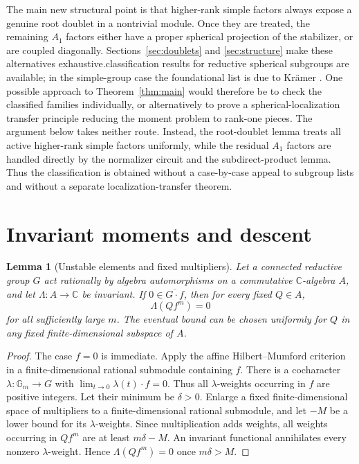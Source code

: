 \documentclass[11pt]{article}
\numberwithin{equation}{section}
\newtheorem{lemma}[theorem]{Lemma}
\theoremstyle{definition}
\theoremstyle{remark}
\newcommand{\C}{\mathbb C}
\newcommand{\Gm}{\mathbb G_m}
\begin{document}
The main new structural point is that higher-rank simple factors always expose a genuine root doublet in a nontrivial module. Once they are treated, the remaining $A_1$ factors either have a proper spherical projection of the stabilizer, or are coupled diagonally. Sections~\ref{sec:doublets} and \ref{sec:structure} make these alternatives exhaustive.\n\nClassical classification results for reductive spherical subgroups are available; in the simple-group case the foundational list is due to Kr\"amer \cite{Kramer}. One possible approach to Theorem~\ref{thm:main} would therefore be to check the classified families individually, or alternatively to prove a spherical-localization transfer principle reducing the moment problem to rank-one pieces. The argument below takes neither route. Instead, the root-doublet lemma treats all active higher-rank simple factors uniformly, while the residual $A_1$ factors are handled directly by the normalizer circuit and the subdirect-product lemma. Thus the classification is obtained without a case-by-case appeal to subgroup lists and without a separate localization-transfer theorem.

\section{Invariant moments and descent}
\begin{lemma}[Unstable elements and fixed multipliers]\label{lem:unstable}
Let a connected reductive group $G$ act rationally by algebra automorphisms on a commutative $\C$-algebra $A$, and let $\Lambda:A\to\C$ be invariant. If $0\in\overline{G\cdot f}$, then for every fixed $Q\in A$,
\[
 \Lambda(Qf^m)=0
\]
for all sufficiently large $m$. The eventual bound can be chosen uniformly for $Q$ in any fixed finite-dimensional subspace of $A$.
\end{lemma}
\begin{proof}
The case $f=0$ is immediate. Apply the affine Hilbert--Mumford criterion \cite{Kempf} in a finite-dimensional rational submodule containing $f$. There is a cocharacter $\lambda:\Gm\to G$ with $\lim_{t\to0}\lambda(t)\cdot f=0$. Thus all $\lambda$-weights occurring in $f$ are positive integers. Let their minimum be $\delta>0$. Enlarge a fixed finite-dimensional space of multipliers to a finite-dimensional rational submodule, and let $-M$ be a lower bound for its $\lambda$-weights. Since multiplication adds weights, all weights occurring in $Qf^m$ are at least $m\delta-M$. An invariant functional annihilates every nonzero $\lambda$-weight. Hence $\Lambda(Qf^m)=0$ once $m\delta>M$.
\end{proof}
\end{document}
